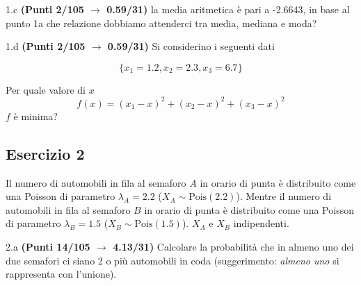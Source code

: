\documentclass[
  11pt,
]{book}
\theoremstyle{mytheoremstyle}
\theoremstyle{mydefstyle}
\begin{document}
1.c \textbf{(Punti 2/105 \(\rightarrow\) 0.59/31)} la media aritmetica è pari a -2.6643, in base al punto 1a che relazione dobbiamo attenderci tra media, mediana e moda?

1.d \textbf{(Punti 2/105 \(\rightarrow\) 0.59/31)} Si considerino i seguenti dati

\[
\{x_1=1.2,x_2=2.3,x_3=6.7\}
\]

Per quale valore di \(x\)
\[
f(x)=(x_1-x)^2+(x_2-x)^2+(x_3-x)^2
\]
\(f\) è minima?

\subsection{Esercizio 2}\label{esercizio-2-31}

Il numero di automobili in fila al semaforo \(A\) in orario di punta è distribuito come una
Poisson di parametro \(\lambda_A=2.2\) (\(X_A\sim \text{Pois}(2.2)\)).
Mentre il numero di automobili in fila al semaforo \(B\) in orario di punta è distribuito come una
Poisson di parametro \(\lambda_B=1.5\) (\(X_B\sim \text{Pois}(1.5)\)). \(X_A\) e \(X_B\) indipendenti.

2.a \textbf{(Punti 14/105 \(\rightarrow\) 4.13/31)} Calcolare la probabilità che in almeno uno dei due semafori ci siano 2 o più automobili in coda (suggerimento: \emph{almeno uno} si rappresenta con l'unione).
\end{document}
